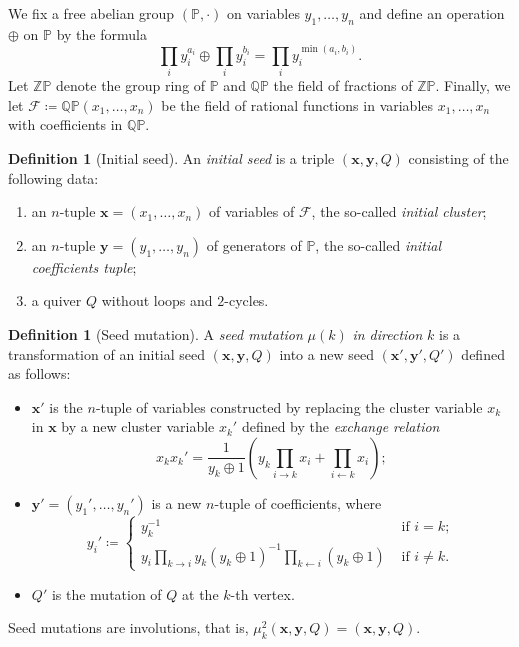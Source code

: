 \documentclass[a4paper,oneside,svgnames,draft]{amsart}
\theoremstyle{plain}
\theoremstyle{definition}
\newtheorem{definition}[theorem]{Definition}
\begin{document}
 We fix a free abelian group $(\mathbb{P}, \cdot )$ on variables
 $y_1,\ldots,y_n$ and define an operation $ \oplus $ on $\mathbb{P}$ by the
 formula
 \[
  \prod_i y_i^{a_i} \oplus \prod_i y_i^{b_i} = \prod_i y_i^{\min(a_i,b_i)}.
 \]
 Let $\mathbb{Z}\mathbb{P}$ denote the group ring of $\mathbb{P}$ and
 $\mathbb{Q}\mathbb{P}$ the field of fractions of $\mathbb{Z}\mathbb{P}$.
 Finally, we let $\mathcal{F} \coloneqq \mathbb{Q}\mathbb{P}(x_1,\ldots,x_n)$ be
 the field of rational functions in variables $x_1,\ldots,x_n$ with coefficients
 in $\mathbb{Q}\mathbb{P}$.

 \begin{definition}[Initial seed]
  An \emph{initial seed} is a triple $(\mathbf{x},\mathbf{y},Q)$ consisting of
  the following data:
  \begin{enumerate}
   \item an $n$-tuple $\mathbf{x} = (x_1,\ldots,x_n)$ of variables of
    $\mathcal{F}$, the so-called \emph{initial cluster};
   \item an $n$-tuple $\mathbf{y} = (y_1,\ldots,y_n)$ of generators of
    $\mathbb{P}$, the so-called \emph{initial coefficients tuple};
   \item a quiver $Q$ without loops and $2$-cycles.
  \end{enumerate}
 \end{definition}

 \begin{definition}[Seed mutation]
  A \emph{seed mutation} $\mu(k)$ \emph{in direction} $k$ is a transformation of
  an initial seed $(\mathbf{x},\mathbf{y},Q)$ into a new seed
  $(\mathbf{x'},\mathbf{y'},Q')$ defined as follows:
  \begin{itemize}
   \item $\mathbf{x'}$ is the $n$-tuple of variables constructed by replacing
    the cluster variable $x_k$ in $\mathbf{x}$ by a new cluster variable $x_k'$
    defined by the \emph{exchange relation}
    \[
     x_kx_k' = \frac{1}{y_k \oplus 1}\left( y_k \prod_{i \to k} x_i +
     \prod_{i \leftarrow k} x_i \right);
    \]
   \item $\mathbf{y'} = (y_1',\ldots,y_n')$ is a new $n$-tuple of coefficients,
    where
    \[
     y_i' \coloneqq \begin{cases}
      y_k^{-1} & \text{ if } i = k;\\
      y_i \prod_{k \to i} y_k(y_k \oplus 1)^{-1}\prod_{k \leftarrow i} (y_k
      \oplus 1) & \text{ if } i \neq k.
     \end{cases}
    \]
   \item $Q'$ is the mutation of $Q$ at the $k$-th vertex.
  \end{itemize}
 \end{definition}
 Seed mutations are involutions, that is, $\mu_k^2(\mathbf{x},\mathbf{y},Q) =
 (\mathbf{x},\mathbf{y},Q)$.
\end{document}
